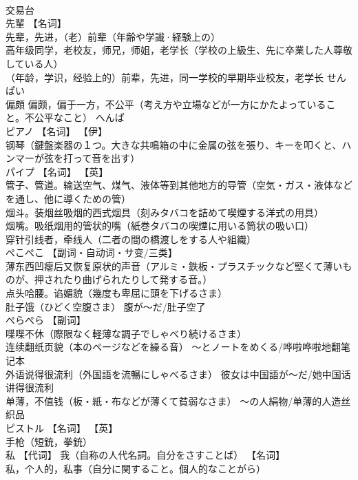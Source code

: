\documentclass[8pt]{extreport}
\begin{document}
\begin{CJK}{UTF8}{min}
\\	交易台		
\\	先輩	【名词】 
\\	先辈，先进，（老）前辈（年齢や学識·経験上の） 
\\	高年级同学，老校友，师兄，师姐，老学长（学校の上級生、先に卒業した人尊敬している人） 
\\	（年龄，学识，经验上的）前辈，先进，同一学校的早期毕业校友，老学长	せんぱい	
\\	偏頗	偏颇，偏于一方，不公平（考え方や立場などが一方にかたよっていること。不公平なこと）	へんぱ	
\\	ピアノ	【名词】 【伊】
\\	钢琴（鍵盤楽器の１つ。大きな共鳴箱の中に金属の弦を張り、キーを叩くと、ハンマーが弦を打って音を出す）		
\\	パイプ	【名词】 【英】
\\	管子、管道。输送空气、煤气、液体等到其他地方的导管（空気・ガス・液体などを通し、他に導くための管） 
\\	烟斗。装烟丝吸烟的西式烟具（刻みタバコを詰めて喫煙する洋式の用具） 
\\	烟嘴。吸纸烟用的管状的嘴（紙巻タバコの喫煙に用いる筒状の吸い口） 
\\	穿针引线者，牵线人（二者の間の橋渡しをする人や組織）		
\\	ぺこぺこ	【副词・自动词・サ变/三类】 
\\	薄东西凹瘪后又恢复原状的声音（アルミ・鉄板・プラスチックなど堅くて薄いものが、押されたり曲げられたりして発する音。） 
\\	点头哈腰。谄媚貌（幾度も卑屈に頭を下げるさま） 
\\	肚子饿（ひどく空腹さま） 腹が〜だ/肚子空了		
\\	ぺらぺら	【副词】 
\\	喋喋不休（際限なく軽薄な調子でしゃべり続けるさま） 
\\	连续翻纸页貌（本のページなどを繰る音） ～とノートをめくる/哗啦哗啦地翻笔记本 
\\	外语说得很流利（外国語を流暢にしゃべるさま） 彼女は中国語が～だ/她中国话讲得很流利 
\\	单薄，不值钱（板・紙・布などが薄くて貧弱なさま） ～の人絹物/单薄的人造丝织品		
\\	ピストル	【名词】 【英】
\\	手枪（短銃，拳銃）		
\\	私	【代词】 我（自称の人代名詞。自分をさすことば） 【名词】 
\\	私，个人的，私事（自分に関すること。個人的なことがら） 

\end{CJK}
\end{document}
